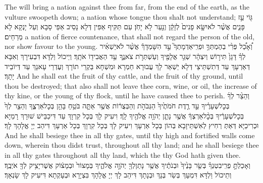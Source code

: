{The \lord\space will bring a nation against thee from far, from the end of the earth, as the vulture swoopeth down; a nation whose tongue thou shalt not understand;}{}
{גּ֖וֹי עַ֣ז פָּנִ֑ים אֲשֶׁ֨ר לֹא\maqqaf יִשָּׂ֤א פָנִים֙ לְזָקֵ֔ן וְנַ֖עַר לֹ֥א יָחֹֽן׃}
{עַם תַּקִּיף אַפִּין דְּלָא נָסֵיב אַפֵּי סָבָא וְעַל יָנְקָא לָא מְרַחֵים׃}
{a nation of fierce countenance, that shall not regard the person of the old, nor show favour to the young.}{}
{וְ֠אָכַ֠ל פְּרִ֨י בְהֶמְתְּךָ֥ וּפְרִֽי\maqqaf אַדְמָתְךָ֮ עַ֣ד הִשָּׁמְדָךְ֒ אֲשֶׁ֨ר לֹא\maqqaf יַשְׁאִ֜יר לְךָ֗ דָּגָן֙ תִּיר֣וֹשׁ וְיִצְהָ֔ר שְׁגַ֥ר אֲלָפֶ֖יךָ וְעַשְׁתְּרֹ֣ת צֹאנֶ֑ךָ עַ֥ד הַאֲבִיד֖וֹ אֹתָֽךְ׃}
{וְיֵיכוֹל וַלְדָּא דִּבְעִירָךְ וְאִבָּא דְּאַרְעָךְ עַד דְּתִשְׁתֵּיצֵי דְּלָא יַשְׁאַר לָךְ עֲבוּרָא חַמְרָא וּמִשְׁחָא בַּקְרֵי תוֹרָךְ וְעֶדְרֵי עָאנָךְ עַד דְּיוֹבֵיד יָתָךְ׃}
{And he shall eat the fruit of thy cattle, and the fruit of thy ground, until thou be destroyed; that also shall not leave thee corn, wine, or oil, the increase of thy kine, or the young of thy flock, until he have caused thee to perish.}{}
{וְהֵצַ֨ר לְךָ֜ בְּכׇל\maqqaf שְׁעָרֶ֗יךָ עַ֣ד רֶ֤דֶת חֹמֹתֶ֙יךָ֙ הַגְּבֹהֹ֣ת וְהַבְּצֻר֔וֹת אֲשֶׁ֥ר אַתָּ֛ה בֹּטֵ֥חַ בָּהֵ֖ן בְּכׇל\maqqaf אַרְצֶ֑ךָ וְהֵצַ֤ר לְךָ֙ בְּכׇל\maqqaf שְׁעָרֶ֔יךָ בְּכׇ֨ל\maqqaf אַרְצְךָ֔ אֲשֶׁ֥ר נָתַ֛ן יְהֹוָ֥ה אֱלֹהֶ֖יךָ לָֽךְ׃}
{וִיעִיק לָךְ בְּכָל קִרְוָךְ עַד דִּיכַבֵּישׁ שׁוּרָךְ רָמַיָּא וּכְרִיכַיָּא דְּאַתְּ רְחִיץ לְאִשְׁתֵּיזָבָא בְּהוֹן בְּכָל אַרְעָךְ וִיעִיק לָךְ בְּכָל קִרְוָךְ בְּכָל אַרְעָךְ דִּיהַב יְיָ אֱלָהָךְ לָךְ׃}
{And he shall besiege thee in all thy gates, until thy high and fortified walls come down, wherein thou didst trust, throughout all thy land; and he shall besiege thee in all thy gates throughout all thy land, which the \lord\space thy God hath given thee.}{}
{וְאָכַלְתָּ֣ פְרִֽי\maqqaf בִטְנְךָ֗ בְּשַׂ֤ר בָּנֶ֙יךָ֙ וּבְנֹתֶ֔יךָ אֲשֶׁ֥ר נָתַן\maqqaf לְךָ֖ יְהֹוָ֣ה אֱלֹהֶ֑יךָ בְּמָצוֹר֙ וּבְמָצ֔וֹק אֲשֶׁר\maqqaf יָצִ֥יק לְךָ֖ אֹיְבֶֽךָ׃}
{וְתֵיכוֹל וַלְדָּא דִּמְעָךְ בְּשַׂר בְּנָךְ וּבְנָתָךְ דִּיהַב לָךְ יְיָ אֱלָהָךְ בִּצְיָרָא וּבְעָקְתָא דִּיעִיק לָךְ שָׂנְאָךְ׃}
